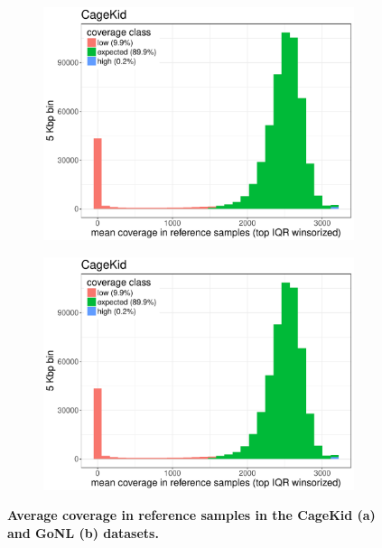 \begin{figure}[htp]
  \centering
  \begin{subfigure}[b]{.48\textwidth}
    \includegraphics[width=\linewidth,page=1]{figures/wgs-coverage-tracks-cagekid-gonl.pdf}
    \caption{}
  \end{subfigure}
  \begin{subfigure}[b]{.48\textwidth}
    \includegraphics[width=\linewidth,page=3]{figures/wgs-coverage-tracks-cagekid-gonl.pdf}
    \caption{}
  \end{subfigure}

  \caption[Average coverage in reference samples in the CageKid and GoNL datasets.]{{\bf Average coverage in reference samples in the CageKid (a) and GoNL (b) datasets.}}
  \label{fig:covclass2}
\end{figure}

